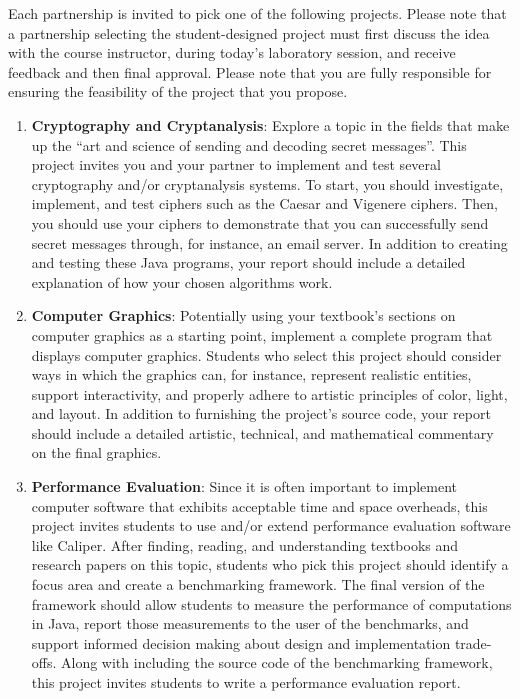 Each partnership is invited to pick one of the following projects.  Please note that a partnership selecting the
student-designed project must first discuss the idea with the course instructor, during today's laboratory session, and
receive feedback and then final approval.  Please note that you are fully responsible for ensuring the feasibility of
the project that you propose.

\begin{enumerate}

  \item {\bf Cryptography and Cryptanalysis}: Explore a topic in the fields that make up the ``art and science of
    sending and decoding secret messages''. This project invites you and your partner to implement and test several cryptography
    and/or cryptanalysis systems.  To start, you should investigate, implement, and test ciphers such as the Caesar and
    Vigenere ciphers. Then, you should use your ciphers to demonstrate that you can successfully send secret messages
    through, for instance, an email server. In addition to creating and testing these Java programs, your report should
    include a detailed explanation of how your chosen algorithms work.

  \item {\bf Computer Graphics}: Potentially using your textbook's sections on computer graphics as a starting point,
    implement a complete program that displays computer graphics.  Students who select this project should consider ways
    in which the graphics can, for instance, represent realistic entities, support interactivity, and properly adhere to
    artistic principles of color, light, and layout. In addition to furnishing the project's source code, your report
    should include a detailed artistic, technical, and mathematical commentary on the final graphics.

  \item {\bf Performance Evaluation}: Since it is often important to implement computer software that exhibits
    acceptable time and space overheads, this project invites students to use and/or extend performance evaluation
    software like Caliper.  After finding, reading, and understanding textbooks and research papers on this topic,
    students who pick this project should identify a focus area and create a benchmarking framework.  The
    final version of the framework should allow students to measure the performance of computations in Java, report
    those measurements to the user of the benchmarks, and support informed decision making about design and
    implementation trade-offs.  Along with including the source code of the benchmarking framework, this
    project invites students to write a performance evaluation report.


\end{enumerate}
